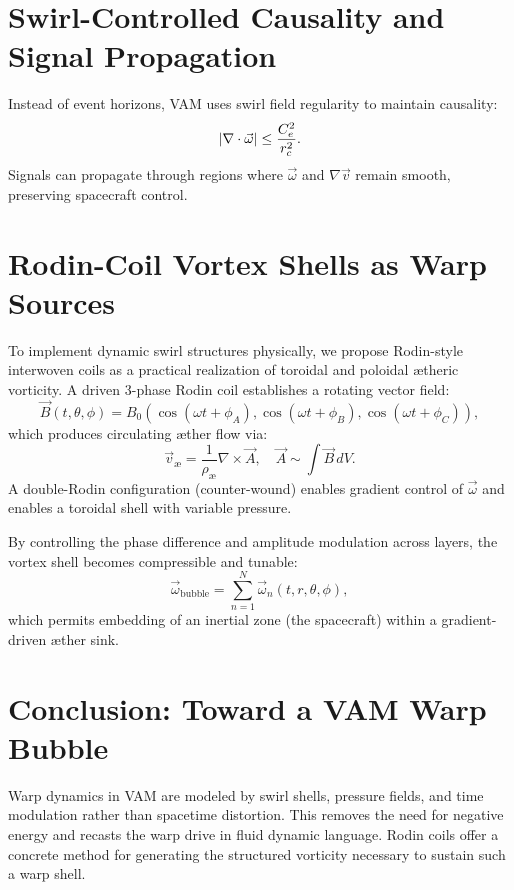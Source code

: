 \documentclass[12pt]{article}
\begin{document}
\section{Swirl-Controlled Causality and Signal Propagation}
Instead of event horizons, VAM uses swirl field regularity to maintain causality:
\begin{equation}
    \abs{\nabla \cdot \vec{\omega}} \leq \frac{C_e^2}{r_c^2}.
\end{equation}
Signals can propagate through regions where \( \vec{\omega} \) and \( \nabla \vec{v} \) remain smooth, preserving spacecraft control.

\section{Rodin-Coil Vortex Shells as Warp Sources}
To implement dynamic swirl structures physically, we propose Rodin-style interwoven coils as a practical realization of toroidal and poloidal ætheric vorticity. A driven 3-phase Rodin coil establishes a rotating vector field:
\begin{equation}
    \vec{B}(t,\theta,\phi) = B_0 \left(\cos(\omega t + \phi_A), \cos(\omega t + \phi_B), \cos(\omega t + \phi_C)\right),
\end{equation}
which produces circulating æther flow via:
\begin{equation}
    \vec{v}_\text{\ae} = \frac{1}{\rho_\text{\ae}} \nabla \times \vec{A}, \quad \vec{A} \sim \int \vec{B} \, dV.
\end{equation}
A double-Rodin configuration (counter-wound) enables gradient control of \( \vec{\omega} \) and enables a toroidal shell with variable pressure.

By controlling the phase difference and amplitude modulation across layers, the vortex shell becomes compressible and tunable:
\begin{equation}
    \vec{\omega}_{\text{bubble}} = \sum_{n=1}^N \vec{\omega}_n(t, r, \theta, \phi),
\end{equation}
which permits embedding of an inertial zone (the spacecraft) within a gradient-driven æther sink.

\section{Conclusion: Toward a VAM Warp Bubble}
Warp dynamics in VAM are modeled by swirl shells, pressure fields, and time modulation rather than spacetime distortion. This removes the need for negative energy and recasts the warp drive in fluid dynamic language. Rodin coils offer a concrete method for generating the structured vorticity necessary to sustain such a warp shell.
\end{document}
